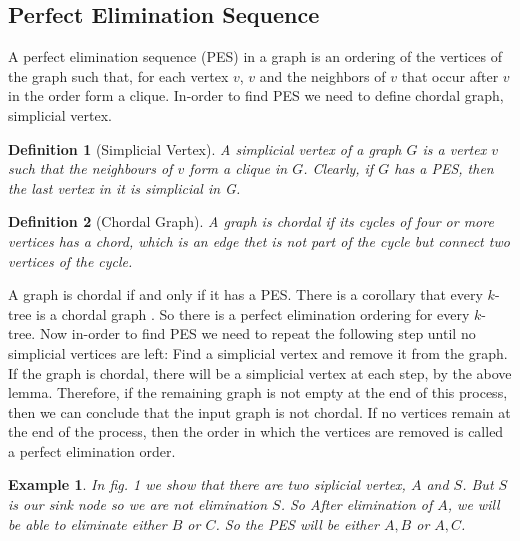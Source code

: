 \documentclass[12pt]{article}
\newtheorem*{defi}{Definition}
\newtheorem{exmp}{Example}[section]
\begin{document}
\subsection{Perfect Elimination Sequence}
A perfect elimination sequence (PES) in a graph is an ordering of the vertices of the graph such that, for each vertex $v$, $v$ and the neighbors of $v$ that occur after $v$ in the order form a clique. In-order to find PES we need to define chordal graph, simplicial vertex.
\begin{defi}[Simplicial Vertex]
A simplicial vertex of a graph $G$ is a vertex $v$ such that the neighbours of $v$ form a clique in $G$. Clearly, if $G$ has a PES, then the last vertex in it is simplicial in G.
\end{defi}
\begin{defi}[Chordal Graph] 
A graph is chordal if its cycles of four or more vertices has a chord, which is an edge thet is not part of the cycle but connect two vertices of the cycle. 
\end{defi}
A graph is chordal if and only if it has a PES. There is a corollary that every $k$-tree is a chordal graph \cite{heggernes2006treewidth}. So there is a perfect elimination ordering for every $k$-tree. 
Now in-order to find PES we need to repeat the following step until no simplicial vertices are left: Find a simplicial vertex and remove it from the graph.
If the graph is chordal, there will be a simplicial vertex at each step, by the
above lemma. Therefore, if the remaining graph is not empty at the end of
this process, then we can conclude that the input graph is not chordal. If no
vertices remain at the end of the process, then the order in which the vertices
are removed is called a perfect elimination order.
\begin{exmp}
In fig. 1 we show that there are two siplicial vertex, $A$ and $S$. But $S$ is our sink node so we are not elimination $S$. So After elimination of $A$, we will be able to eliminate either $B$ or $C$. So the PES will be either $A,B$ or $A,C$.
\end{exmp}
\end{document}
